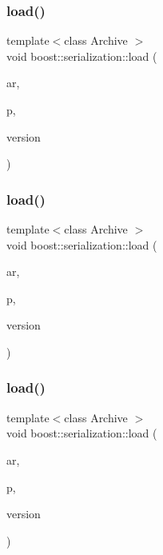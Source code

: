 \mbox{\label{namespaceboost_1_1serialization_a7b78d5cf4b5caa328bef6a087fbaff9c}} 
\subsubsection{\texorpdfstring{load()}{load()}\hspace{0.1cm}{\footnotesize\ttfamily [3/6]}}
{\footnotesize\ttfamily template$<$class Archive $>$ \\
void boost\+::serialization\+::load (\begin{DoxyParamCaption}\item[{Archive \&}]{ar,  }\item[{N\+T\+L\+::\+Z\+ZX \&}]{p,  }\item[{const unsigned int}]{version }\end{DoxyParamCaption})}

\mbox{\label{namespaceboost_1_1serialization_a020abf1a3721352f3f93367e476adb75}} 
\subsubsection{\texorpdfstring{load()}{load()}\hspace{0.1cm}{\footnotesize\ttfamily [4/6]}}
{\footnotesize\ttfamily template$<$class Archive $>$ \\
void boost\+::serialization\+::load (\begin{DoxyParamCaption}\item[{Archive \&}]{ar,  }\item[{N\+T\+L\+::vec\+\_\+\+ZZ \&}]{p,  }\item[{const unsigned int}]{version }\end{DoxyParamCaption})}

\mbox{\label{namespaceboost_1_1serialization_afd8ccb691b59647d2c043b64fe0ea28d}} 
\subsubsection{\texorpdfstring{load()}{load()}\hspace{0.1cm}{\footnotesize\ttfamily [5/6]}}
{\footnotesize\ttfamily template$<$class Archive $>$ \\
void boost\+::serialization\+::load (\begin{DoxyParamCaption}\item[{Archive \&}]{ar,  }\item[{N\+T\+L\+::vec\+\_\+\+Z\+Z\+\_\+p \&}]{p,  }\item[{const unsigned int}]{version }\end{DoxyParamCaption})}

